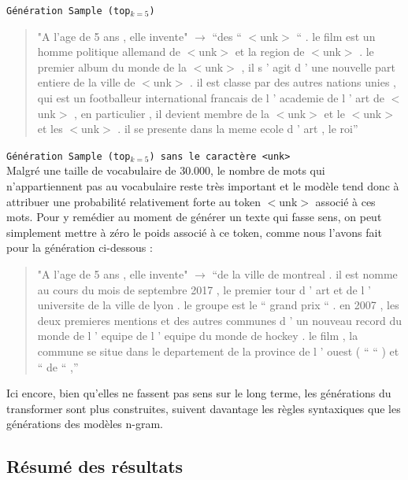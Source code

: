 \noindent{} \texttt{Génération Sample (top$_{k=5}$)}  \\

\begin{quotation}
"A l'age de 5 ans , elle invente" $\rightarrow$ “des `` $<$unk$>$ `` . le film est un homme politique allemand de $<$unk$>$ et la region de $<$unk$>$ . le premier album du monde de la $<$unk$>$ , il s ' agit d ' une nouvelle part entiere de la ville de $<$unk$>$ . il est classe par des autres nations unies , qui est un footballeur international francais de l ' academie de l ' art de $<$unk$>$ , en particulier , il devient membre de la $<$unk$>$ et le $<$unk$>$ et les $<$unk$>$ . il se presente dans la meme ecole d ' art , le roi”
\end{quotation}

\vspace{0.4cm}

\noindent{} \texttt{Génération Sample (top$_{k=5}$) sans le caractère <unk>}  \\

Malgré une taille de vocabulaire de 30.000, le nombre de mots qui n’appartiennent pas au vocabulaire reste très important et le modèle tend donc à attribuer une probabilité relativement forte au token $<$unk$>$ associé à ces mots. Pour y remédier au moment de générer un texte qui fasse sens, on peut simplement mettre à zéro le poids associé à ce token, comme nous l’avons fait pour la génération ci-dessous :

\begin{quotation}
"A l'age de 5 ans , elle invente" $\rightarrow$ “de la ville de montreal . il est nomme au cours du mois de septembre 2017 , le premier tour d ' art et de l ' universite de la ville de lyon . le groupe est le `` grand prix `` . en 2007 , les deux premieres mentions et des autres communes d ' un nouveau record du monde de l ' equipe de l ' equipe du monde de hockey . le film , la commune se situe dans le departement de la province de l ' ouest ( `` `` ) et `` de `` ,”
\end{quotation}

Ici encore, bien qu'elles ne fassent pas sens sur le long terme, les générations du transformer sont plus construites, suivent davantage les règles syntaxiques que les générations des modèles n-gram.

\subsection{Résumé des résultats}

